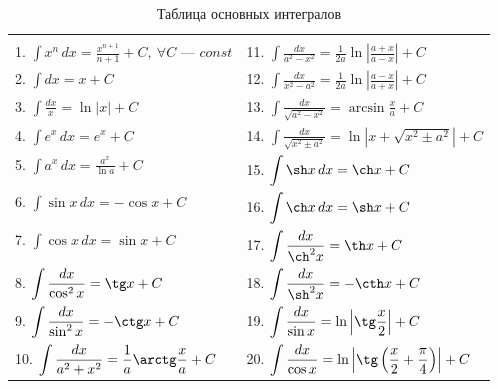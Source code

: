 \begin{table}[h]
    \caption{Таблица основных интегралов}
    \centering
    \begin{tabular}{|ll|}
        \hline
         & \\[-8pt]
        1. $\displaystyle \int x^n \, dx = \frac{x^{n+1}}{n+1} + C,\ \forall C \text{ --- } const$ & 11. $\displaystyle \int \frac{dx}{a^2 - x^2} = \frac{1}{2a}\ln \left| \frac{a+x}{a-x} \right| + C$ \\[2ex]
        2. $\displaystyle \int dx = x + C$ & 12. $\displaystyle \int \frac{dx}{x^2 - a^2} = \frac{1}{2a}\ln \left| \frac{a-x}{a+x} \right| + C$ \\[2ex]
        3. $\displaystyle \int \frac{dx}{x} = \ln |x| + C$ & 13. $\displaystyle \int \frac{dx}{\sqrt{a^2 - x^2}} = \arcsin \frac{x}{a} + C$ \\[2ex]
        4. $\displaystyle \int e^x\, dx = e^x + C$ & 14. $\displaystyle \int \frac{dx}{\sqrt{x^2 \pm a^2}} = \ln \left|x + \sqrt{x^2 \pm a^2}\right| + C$ \\[2ex]
        5. $\displaystyle \int a^x\, dx = \frac{a^x}{\ln a} + C$ & 15. $\displaystyle \int \sh x\, dx = \ch x + C$\\[2ex]
        6. $\displaystyle \int \sin x\, dx = -\cos x + C$ & 16. $\displaystyle \int \ch x\, dx = \sh x + C$ \\[2ex]
        7. $\displaystyle \int \cos x\, dx = \sin x + C$ & 17. $\displaystyle \int \frac{dx}{\ch^2x} = \th x + C$ \\[2ex]
        8. $\displaystyle \int \frac{dx}{\cos^2x} = \tg x + C$ & 18. $\displaystyle \int \frac{dx}{\sh^2x} = - \cth x + C$\\[2ex]
        9. $\displaystyle \int \frac{dx}{\sin^2x} = -\ctg x + C$ & 19. $\displaystyle \int \frac{dx}{\sin x} = \ln \left| \tg \frac{x}{2} \right| + C$ \\[2ex]
        10. $\displaystyle \int \frac{dx}{a^2 + x^2} = \frac{1}{a}\arctg \frac{x}{a} + C$ & 20. $\displaystyle \int \frac{dx}{\cos x} = \ln \left| \tg \left(\frac{x}{2} + \frac{\pi}{4}\right) \right| + C$ \\[2ex]
        \hline
    \end{tabular}
\end{table}

